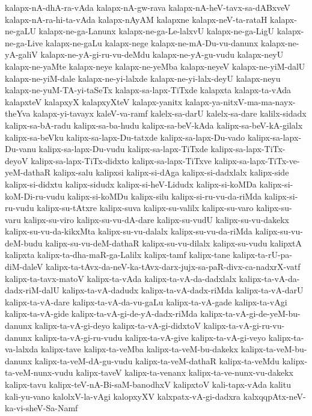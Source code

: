 {kalapx-nA-dhA-ra-vAda
kalapx-nA-gw-rava
kalapx-nA-heV-tavx-sa-dABxveV
kalapx-nA-ra-hi-ta-vAda
kalapx-nAyAM
kalapxne
kalapx-neV-ta-rataH
kalapx-ne-gaLU
kalapx-ne-ga-Lanunx
kalapx-ne-ga-Le-lalxvU
kalapx-ne-ga-LigU
kalapx-ne-ga-Live
kalapx-ne-gaLu
kalapx-nege
kalapx-ne-mA-Du-vu-danunx
kalapx-ne-yA-galiV
kalapx-ne-yA-gi-ru-vu-deMdu
kalapx-ne-yA-gu-vudu
kalapx-neyU
kalapx-ne-yaMte
kalapx-neye
kalapx-ne-yeMba
kalapx-neyeV
kalapx-ne-yiM-dalU
kalapx-ne-yiM-dale
kalapx-ne-yi-lalxde
kalapx-ne-yi-lalx-deyU
kalapx-neyu
kalapx-ne-yuM-TA-yi-taSeTx
kalapx-sa-lapx-TiTxde
kalapxta
kalapx-ta-vAda
kalapxteV
kalapxyX
kalapxyXteV
kalapx-yanitx
kalapx-ya-nitxV-ma-ma-nayx-theYva
kalapx-yi-tavayx
kaleV-va-ramf
kalelx-sa-darU
kalelx-sa-dare
kalilx-sidadx
kalipx-sa-bA-radu
kalipx-sa-ba-hudu
kalipx-sa-beV-kAda
kalipx-sa-beV-kA-gilalx
kalipx-sa-beVku
kalipx-sa-lapx-Du-tatxde
kalipx-sa-lapx-Du-vado
kalipx-sa-lapx-Du-vanu
kalipx-sa-lapx-Du-vudu
kalipx-sa-lapx-TiTxde
kalipx-sa-lapx-TiTx-deyoV
kalipx-sa-lapx-TiTx-didxto
kalipx-sa-lapx-TiTxve
kalipx-sa-lapx-TiTx-ve-yeM-dathaR
kalipx-salu
kalipxsi
kalipx-si-dAga
kalipx-si-dadxlalx
kalipx-side
kalipx-si-didxtu
kalipx-sidudx
kalipx-si-heV-Lidudx
kalipx-si-koMDa
kalipx-si-koM-Di-ru-vudu
kalipx-si-koMDu
kalipx-silu
kalipx-si-ru-vu-da-riMda
kalipx-si-ru-vudu
kalipx-su-tAtxre
kalipx-suva
kalipx-su-valilx
kalipx-su-varo
kalipx-su-varu
kalipx-su-viro
kalipx-su-vu-dA-dare
kalipx-su-vudU
kalipx-su-vu-dakekx
kalipx-su-vu-da-kikxMta
kalipx-su-vu-dalalx
kalipx-su-vu-da-riMda
kalipx-su-vu-deM-budu
kalipx-su-vu-deM-dathaR
kalipx-su-vu-dilalx
kalipx-su-vudu
kalipxtA
kalipxta
kalipx-ta-dha-maR-ga-Lalilx
kalipx-tamf
kalipx-tane
kalipx-ta-rU-pa-diM-daleV
kalipx-ta-tAvx-da-neV-ka-tAvx-darx-jujx-sa-paR-divx-ca-nadxrX-vatf
kalipx-ta-tavx-matoV
kalipx-ta-vAda
kalipx-ta-vA-da-dadxlalx
kalipx-ta-vA-da-dadx-riM-dalU
kalipx-ta-vA-dadudx
kalipx-ta-vA-dadx-riMda
kalipx-ta-vA-darU
kalipx-ta-vA-dare
kalipx-ta-vA-da-vu-gaLu
kalipx-ta-vA-gade
kalipx-ta-vAgi
kalipx-ta-vA-gide
kalipx-ta-vA-gi-de-yA-dadx-riMda
kalipx-ta-vA-gi-de-yeM-bu-danunx
kalipx-ta-vA-gi-deyo
kalipx-ta-vA-gi-didxtoV
kalipx-ta-vA-gi-ru-vu-danunx
kalipx-ta-vA-gi-ru-vudu
kalipx-ta-vA-give
kalipx-ta-vA-gi-veyo
kalipx-ta-va-lalxda
kalipx-tave
kalipx-ta-veMba
kalipx-ta-veM-bu-dakekx
kalipx-ta-veM-bu-danunx
kalipx-ta-veM-dA-gu-vudu
kalipx-ta-veM-dathaR
kalipx-ta-veMdu
kalipx-ta-veM-nunx-vudu
kalipx-taveV
kalipx-ta-venanx
kalipx-ta-ve-nunx-vu-dakekx
kalipx-tavu
kalipx-teV-nA-Bi-saM-banodhxV
kalipxtoV
kali-tapx-vAda
kalitu
kali-yu-vano
kalolxV-la-vAgi
kalopxyXV
kalxpatx-vA-gi-dadxra
kalxqqpAtx-neV-ka-vi-sheV-Sa-Namf
}
